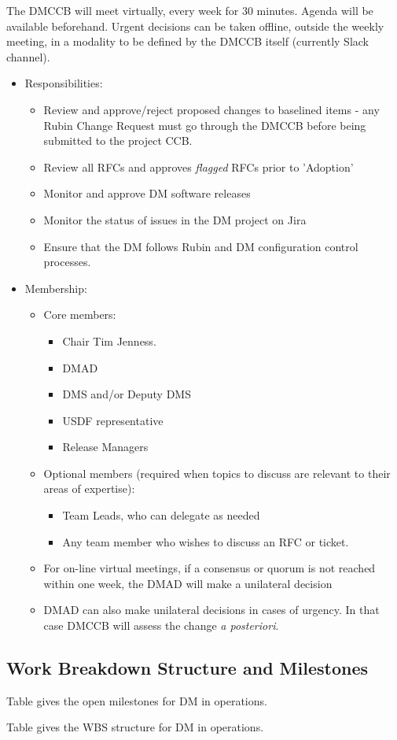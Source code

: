 The DMCCB will meet virtually, every week for 30 minutes. Agenda will be available beforehand.
Urgent decisions can be taken offline, outside the weekly meeting, in a modality to be defined by the DMCCB itself (currently Slack channel).


\begin{itemize}
\item Responsibilities:
        \begin{itemize}
        \item Review and approve/reject proposed changes to baselined items - any Rubin Change Request must go through the DMCCB before being submitted to the project CCB.
        \item Review all RFCs and approves \textit{flagged} RFCs prior to 'Adoption'
        \item Monitor and approve DM software releases
        \item Monitor the status of issues in the DM project on Jira
        \item Ensure that the DM follows Rubin and DM configuration control processes.
        \end{itemize}
\item Membership:
        \begin{itemize}
        \item Core members:
                \begin{itemize}
                \item Chair Tim Jenness.
                \item DMAD
                \item DMS and/or Deputy DMS
                \item USDF representative
                \item Release Managers
                \end{itemize}
        \item Optional members (required when topics to discuss are relevant to their areas of expertise):
                \begin{itemize}
                \item Team Leads, who can delegate as needed %
		\item Any team member who wishes to discuss an RFC or ticket.
                \end{itemize}
        \item For on-line virtual meetings, if a consensus or quorum is not reached within one week, the DMAD will make a unilateral decision
        \item DMAD can also make unilateral decisions in cases of urgency. In that case DMCCB will assess the change \textit{a posteriori}.
        \end{itemize}
\end{itemize}


\subsection{Work Breakdown Structure and Milestones} \label{sec:wbs}

Table  gives the open milestones  for DM in operations.


Table  gives the WBS structure for DM in operations.



